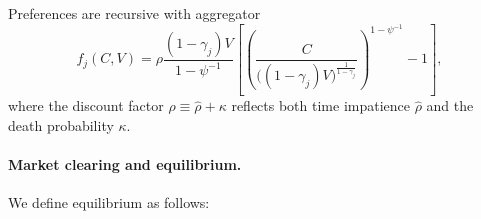 Preferences are recursive with aggregator  
\begin{equation}
    f_j(C,V) = \rho \frac{(1-\gamma_j) V}{1-\psi^{-1}} 
    \left[ \left( \frac{C}{\big((1-\gamma_j)V\big)^{\frac{1}{1-\gamma_j}}} \right)^{1-\psi^{-1}} - 1 \right],
\end{equation}
where the discount factor $\rho \equiv \hat{\rho}+\kappa$ reflects both time impatience $\hat{\rho}$ and the death probability $\kappa$.



\paragraph{Market clearing and equilibrium.} 

We define equilibrium as follows:

